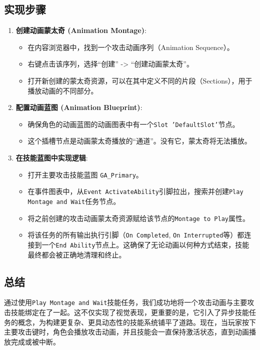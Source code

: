 \documentclass[10pt,CJKmath]{zhbook-v1}
\begin{document}
\subsection{实现步骤}
\begin{enumerate}
    \item \textbf{创建动画蒙太奇 (Animation Montage)}:
    \begin{itemize}
        \item 在内容浏览器中，找到一个攻击动画序列（Animation Sequence）。
        \item 右键点击该序列，选择“创建” -> “创建动画蒙太奇”。
        \item 打开新创建的蒙太奇资源，可以在其中定义不同的片段（Sections），用于播放动画的不同部分。
    \end{itemize}
    \item \textbf{配置动画蓝图 (Animation Blueprint)}:
    \begin{itemize}
        \item 确保角色的动画蓝图的动画图表中有一个\texttt{Slot 'DefaultSlot'}节点。
        \item 这个插槽节点是动画蒙太奇播放的“通道”。没有它，蒙太奇将无法播放。
    \end{itemize}
    \item \textbf{在技能蓝图中实现逻辑}:
    \begin{itemize}
        \item 打开主要攻击技能蓝图 \texttt{GA\_Primary}。
        \item 在事件图表中，从\texttt{Event ActivateAbility}引脚拉出，搜索并创建\texttt{Play Montage and Wait}任务节点。
        \item 将之前创建的攻击动画蒙太奇资源赋给该节点的\texttt{Montage to Play}属性。
        \item 将该任务的所有输出执行引脚（\texttt{On Completed}, \texttt{On Interrupted}等）都连接到一个\texttt{End Ability}节点上。这确保了无论动画以何种方式结束，技能最终都会被正确地清理和终止。
    \end{itemize}
\end{enumerate}

\subsection{总结}
通过使用\texttt{Play Montage and Wait}技能任务，我们成功地将一个攻击动画与主要攻击技能绑定在了一起。这不仅实现了视觉表现，更重要的是，它引入了异步技能任务的概念，为构建更复杂、更具动态性的技能系统铺平了道路。现在，当玩家按下主要攻击键时，角色会播放攻击动画，并且技能会一直保持激活状态，直到动画播放完成或被中断。
\end{document}
